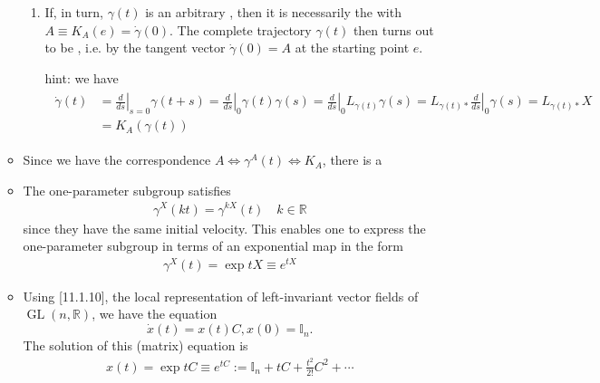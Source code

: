 \documentclass{article}
\newcommand{\GL}{\operatorname{GL}}
\begin{document}
\begin{enumerate}
\begin{itemize}
\begin{enumerate}
\item If, in turn, $\gamma(t)$ is an arbitrary ,
then it is necessarily the  with $A \equiv K_A(e)=\dot{\gamma}(0)$. The complete trajectory $\gamma(t)$ then turns out to be , i.e. by the tangent vector $\dot{\gamma}(0)=A$ at the
starting point $e.$

{\tiny hint: we have
\begin{align*}
\begin{aligned}
\dot{\gamma}(t) &=\left.\frac{d}{d s}\right|_{s=0} \gamma(t+s)=\left.\frac{d}{d s}\right|_0 \gamma(t) \gamma(s)=\left.\frac{d}{d s}\right|_0 L_{\gamma(t)} \gamma(s)=\left.L_{\gamma(t) *} \frac{d}{d s}\right|_0 \gamma(s)=L_{\gamma(t) *} X \\
&=K_A(\gamma(t))
\end{aligned}
\end{align*}}
    \end{enumerate}
    \item Since we have the correspondence $A\Leftrightarrow\gamma^A(t)\Leftrightarrow K_A$, there is a 
    \begin{figure}[H]
        \centering
    \end{figure}
    \item The one-parameter subgroup satisfies
\begin{align*}
\gamma^X(k t)=\gamma^{k X}(t) \quad k \in \mathbb{R}
\end{align*}
since they have the same initial velocity. This enables one to express the one-parameter subgroup in terms of an exponential map in the form
\begin{align*}
\gamma^X(t)=\exp t X \equiv e^{t X}
\end{align*}

\item \tb{explicit form on $\GL(n, \mathbb{R})$:} Using \cite{fecko2006differential}[11.1.10], the local representation of left-invariant vector fields of $\GL(n, \mathbb{R})$, we have the equation
$$\dot{x}(t)=x(t) C, x(0)=\mathbb{I}_n.$$
The solution of this (matrix) equation is
\begin{align*}
x(t)=\exp t C \equiv e^{t C}:=\mathbb{I}_n+t C+\frac{t^2}{2 !} C^2+\cdots
\end{align*}
\end{itemize}


\end{enumerate}
\end{document}
